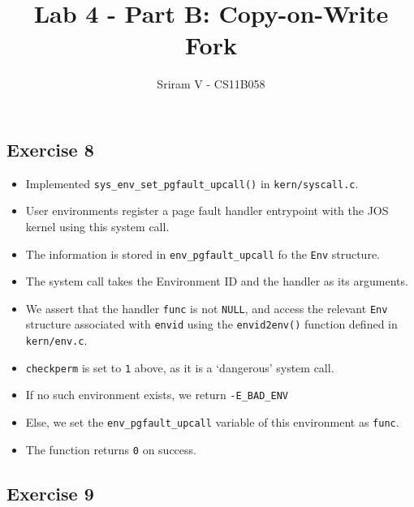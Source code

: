 \documentclass[]{article}
\title{Lab 4 - Part B: Copy-on-Write Fork}
\author{Sriram V - CS11B058}
\date{}
\begin{document}
\maketitle

\subsection{Exercise 8}

\begin{itemize}
\itemsep1pt\parskip0pt
\item
  Implemented \texttt{sys\_env\_set\_pgfault\_upcall()} in
  \texttt{kern/syscall.c}.
\item
  User environments register a page fault handler entrypoint with the
  JOS kernel using this system call.
\item
  The information is stored in \texttt{env\_pgfault\_upcall} fo the
  \texttt{Env} structure.
\item
  The system call takes the Environment ID and the handler as its
  arguments.
\item
  We assert that the handler \texttt{func} is not \texttt{NULL}, and
  access the relevant \texttt{Env} structure associated with
  \texttt{envid} using the \texttt{envid2env()} function defined in
  \texttt{kern/env.c}.
\item
  \texttt{checkperm} is set to \texttt{1} above, as it is a `dangerous'
  system call.
\item
  If no such environment exists, we return \texttt{-E\_BAD\_ENV}
\item
  Else, we set the \texttt{env\_pgfault\_upcall} variable of this
  environment as \texttt{func}.
\item
  The function returns \texttt{0} on success.
\end{itemize}

\subsection{Exercise 9}
\end{document}
